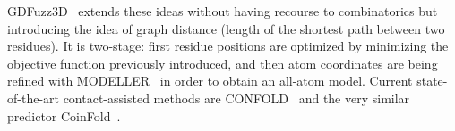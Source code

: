 GDFuzz3D~\cite{pietal2015gdfuzz3d} extends these ideas without having recourse to combinatorics but introducing
the idea of graph distance (length of the shortest path between two residues). It is two-stage: first residue
positions are optimized by minimizing the objective function previously introduced, and then atom coordinates
are being refined with MODELLER~\cite{modeller} in order to obtain an all-atom model.
Current state-of-the-art contact-assisted methods are CONFOLD~\cite{adhikari2015confold, adhikari2018confold2}
and the very similar predictor CoinFold~\cite{wang2016coinfold}.
